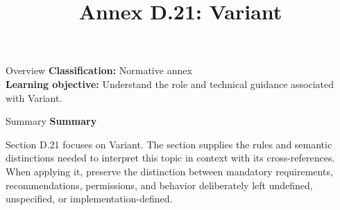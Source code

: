 \documentclass[10pt,letterpaper]{article}
\title{Annex D.21: Variant}
\author{}
\date{}
\begin{document}
\maketitle
\begin{CornellOverviewBox}{Overview}
\textbf{Classification:} Normative annex\\[2pt]
\textbf{Learning objective:} Understand the role and technical guidance associated with Variant.
\end{CornellOverviewBox}\begin{CornellSummaryBox}{Summary}
{\sffamily\bfseries\color{Accent} Summary}\par\vspace{3pt}Section D.21 focuses on Variant. The section supplies the rules and semantic distinctions needed to interpret this topic in context with its cross-references. When applying it, preserve the distinction between mandatory requirements, recommendations, permissions, and behavior deliberately left undefined, unspecified, or implementation-defined.
\end{CornellSummaryBox}
\end{document}
